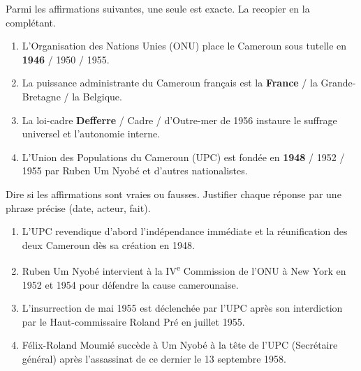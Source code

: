 \documentclass[11pt]{article}
\begin{document}
\begin{exercice}
Parmi les affirmations suivantes, une seule est exacte. La recopier en la complétant.
\begin{enumerate}
\item L'Organisation des Nations Unies (ONU) place le Cameroun sous tutelle en \textbf{1946} / 1950 / 1955.
\item La puissance administrante du Cameroun français est la \textbf{France} / la Grande-Bretagne / la Belgique.
\item La loi-cadre \textbf{Defferre} / Cadre / d'Outre-mer de 1956 instaure le suffrage universel et l'autonomie interne.
\item L'Union des Populations du Cameroun (UPC) est fondée en \textbf{1948} / 1952 / 1955 par Ruben Um Nyobé et d'autres nationalistes.
\end{enumerate}
\end{exercice}

\begin{exercice}
Dire si les affirmations sont vraies ou fausses. Justifier chaque réponse par une phrase précise (date, acteur, fait).
\begin{enumerate}
\item L'UPC revendique d'abord l'indépendance immédiate et la réunification des deux Cameroun dès sa création en 1948.
\item Ruben Um Nyobé intervient à la IV\textsuperscript{e} Commission de l'ONU à New York en 1952 et 1954 pour défendre la cause camerounaise.
\item L'insurrection de mai 1955 est déclenchée par l'UPC après son interdiction par le Haut-commissaire Roland Pré en juillet 1955.
\item Félix-Roland Moumié succède à Um Nyobé à la tête de l'UPC (Secrétaire général) après l'assassinat de ce dernier le 13 septembre 1958.
\end{enumerate}
\end{exercice}
\end{document}
